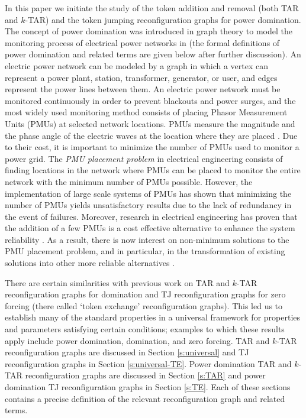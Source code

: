 \documentclass{article}
\numberwithin{figure}{section}   %
\theoremstyle{definition}
\theoremstyle{definition}
\theoremstyle{definition}
\begin{document}
 In this paper we  initiate the study of the token addition and removal (both TAR and $k$-TAR) and the token jumping reconfiguration graphs for power domination.  The  concept of power domination was introduced in graph theory to model the monitoring process of electrical power networks  in \cite{HHHH02} 
 (the formal definitions of power domination and related terms are given below  after further discussion).  An electric power network can be modeled by a graph in which a vertex can represent a power plant, station, transformer, generator, or user, and edges represent the power lines between them.  An electric power network must be monitored continuously in order to prevent blackouts and power surges, and the most widely used monitoring method consists of placing Phasor Measurement Units (PMUs) at selected network locations. PMUs measure  the magnitude and the phase angle of the electric waves at the location where they are placed \cite{BMBA93}. Due to their cost, it is important to minimize the number of PMUs used to monitor a power grid. The {\em PMU placement problem} in electrical engineering consists of finding  locations in the network where PMUs can be placed to monitor the entire network with the minimum number of PMUs possible.   However, the implementation of large scale systems of PMUs has shown that minimizing the number of PMUs yields unsatisfactory results due to the lack of redundancy in the event of failures. Moreover, research in electrical engineering has proven that the addition of a few PMUs is a cost effective alternative to enhance the system reliability \cite{PB18,SW18}. As a result, there is now interest on non-minimum solutions to the PMU placement problem, and in particular, in the transformation of existing solutions into other more reliable alternatives \cite{SW18}. %

 There are certain similarities with previous work on TAR and $k$-TAR reconfiguration graphs for domination \cite{HS14} and TJ reconfiguration graphs for zero forcing \cite{GHH} (there called `token exchange' reconfiguration graphs).  This led us to establish many of the standard properties in a universal framework for properties and parameters satisfying certain conditions; examples to which these results apply include power domination, domination, and zero forcing.  TAR and $k$-TAR  reconfiguration  graphs are discussed in Section \ref{s:universal} and TJ  reconfiguration  graphs in Section \ref{s:universal-TE}.  Power domination  TAR and $k$-TAR reconfiguration  graphs are discussed in Section \ref{s:TAR} and power domination TJ  reconfiguration  graphs in Section \ref{s:TE}.  Each of these sections contains a precise definition of the relevant reconfiguration  graph and related terms.
\end{document}
